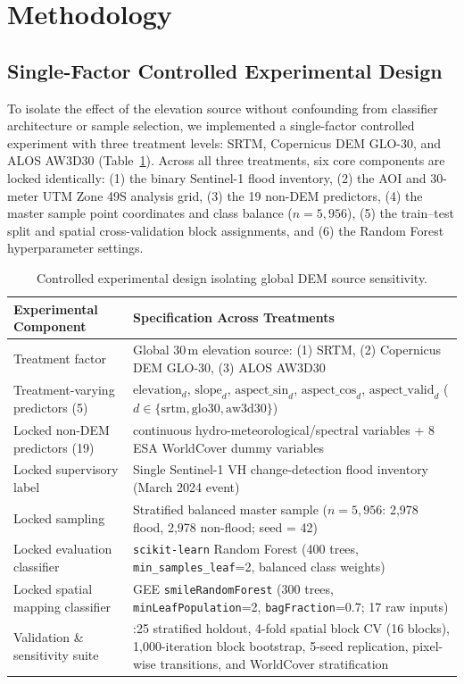 \documentclass[11pt,twoside]{article}
\begin{document}
\section{Methodology}\label{sec:methodology}

\subsection{Single-Factor Controlled Experimental Design}\label{subsec:experimental-design}

To isolate the effect of the elevation source without confounding from classifier architecture or sample selection, we implemented a single-factor controlled experiment with three treatment levels: SRTM, Copernicus DEM GLO-30, and ALOS AW3D30 (Table~\ref{tab:experimental-design}). Across all three treatments, six core components are locked identically: (1) the binary Sentinel-1 flood inventory, (2) the AOI and 30-meter UTM Zone 49S analysis grid, (3) the 19 non-DEM predictors, (4) the master sample point coordinates and class balance ($n = 5{,}956$), (5) the train--test split and spatial cross-validation block assignments, and (6) the Random Forest hyperparameter settings.

\begin{table}[!htbp]
\small
\centering
\caption{Controlled experimental design isolating global DEM source sensitivity.}
\label{tab:experimental-design}
\begin{tabular}{>{\raggedright}p{4.5cm} >{\raggedright\arraybackslash}p{9.8cm}}
\toprule
\textbf{Experimental Component} & \textbf{Specification Across Treatments} \\
\midrule
Treatment factor & Global 30\,m elevation source: (1) SRTM, (2) Copernicus DEM GLO-30, (3) ALOS AW3D30 \\
Treatment-varying predictors (5) & $\text{elevation}_d$, $\text{slope}_d$, $\text{aspect\_sin}_d$, $\text{aspect\_cos}_d$, $\text{aspect\_valid}_d$ ($d \in \{\text{srtm}, \text{glo30}, \text{aw3d30}\}$) \\
Locked non-DEM predictors (19) & 11 continuous hydro-meteorological/spectral variables + 8 ESA WorldCover dummy variables \\
Locked supervisory label & Single Sentinel-1 VH change-detection flood inventory (March 2024 event) \\
Locked sampling & Stratified balanced master sample ($n = 5{,}956$: 2,978 flood, 2,978 non-flood; seed = 42) \\
Locked evaluation classifier & \texttt{scikit-learn} Random Forest (400 trees, \texttt{min\_samples\_leaf}=2, balanced class weights) \\
Locked spatial mapping classifier & GEE \texttt{smileRandomForest} (300 trees, \texttt{minLeafPopulation}=2, \texttt{bagFraction}=0.7; 17 raw inputs) \\
Validation \& sensitivity suite & 75:25 stratified holdout, 4-fold spatial block CV (16 blocks), 1,000-iteration block bootstrap, 5-seed replication, pixel-wise transitions, and WorldCover stratification \\
\bottomrule
\end{tabular}
\end{table}
\end{document}

